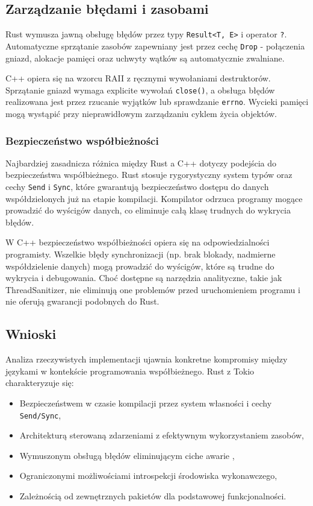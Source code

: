 \subsection{Zarządzanie błędami i zasobami}

Rust wymusza jawną obsługę błędów przez typy \texttt{Result<T, E>} i operator \texttt{?}. Automatyczne sprzątanie zasobów zapewniany jest przez cechę \texttt{Drop} - połączenia gniazd, alokacje pamięci oraz uchwyty wątków są automatycznie zwalniane.

C++ opiera się na wzorcu RAII z ręcznymi wywołaniami destruktorów. Sprzątanie gniazd wymaga explicite wywołań \texttt{close()}, a obsługa błędów realizowana jest przez rzucanie wyjątków lub sprawdzanie \texttt{errno}. Wycieki pamięci mogą wystąpić przy nieprawidłowym zarządzaniu cyklem życia objektów.


\subsubsection{Bezpieczeństwo współbieżności}

Najbardziej zasadnicza różnica między Rust a C++ dotyczy podejścia do bezpieczeństwa współbieżnego. Rust stosuje rygorystyczny system typów oraz cechy \texttt{Send} i \texttt{Sync}, które gwarantują bezpieczeństwo dostępu do danych współdzielonych już na etapie kompilacji. Kompilator odrzuca programy mogące prowadzić do wyścigów danych, co eliminuje całą klasę trudnych do wykrycia błędów.

W C++ bezpieczeństwo współbieżności opiera się na odpowiedzialności programisty. Wszelkie błędy synchronizacji (np. brak blokady, nadmierne współdzielenie danych) mogą prowadzić do wyścigów, które są trudne do wykrycia i debugowania. Choć dostępne są narzędzia analityczne, takie jak ThreadSanitizer, nie eliminują one problemów przed uruchomieniem programu i nie oferują gwarancji podobnych do Rust.



\subsection{Wnioski}

Analiza rzeczywistych implementacji ujawnia konkretne kompromisy między językami w kontekście programowania współbieżnego.
Rust z Tokio charakteryzuje się:
\begin{itemize}
    \item Bezpieczeństwem w czasie kompilacji przez system własności i cechy \texttt{Send/Sync},
    \item Architekturą sterowaną zdarzeniami z efektywnym wykorzystaniem zasobów,
    \item Wymuszonym obsługą błędów eliminującym ciche awarie ,
    \item Ograniczonymi możliwościami introspekcji środowiska wykonawczego,
    \item Zależnością od zewnętrznych pakietów  dla podstawowej funkcjonalności.
\end{itemize}

